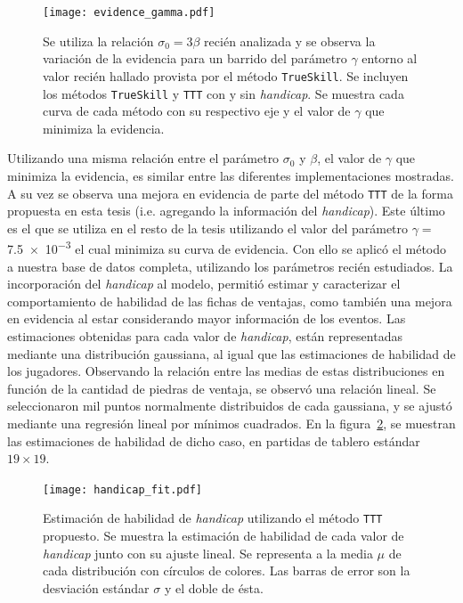 \documentclass[11pt,twoside,spanish]{report} %
\begin{document}
\begin{figure}[H]
	\centering
	\texttt{[image: evidence\_gamma.pdf]}
	\caption{Se utiliza la relaci\'on   $\sigma_0 = 3 \beta$ reci\'en analizada y se observa la variaci\'on de la evidencia para un barrido del par\'ametro $\gamma$ entorno al valor reci\'en hallado provista por el m\'etodo \texttt{TrueSkill}. Se incluyen los m\'etodos \texttt{TrueSkill} y \texttt{TTT} con y sin \textit{handicap}. Se muestra cada curva de cada m\'etodo con su respectivo eje y el valor de $\gamma$ que minimiza la evidencia.}
	\label{fig:tttBetaSigma}
\end{figure}



Utilizando una misma relaci\'on entre el par\'ametro $\sigma_0$ y $\beta$, el valor de $\gamma$ que minimiza la evidencia, es similar entre las diferentes implementaciones mostradas.
A su vez se observa una mejora en evidencia de parte del m\'etodo \texttt{TTT} de la forma propuesta en esta tesis (i.e. agregando la informaci\'on del \textit{handicap}).
Este \'ultimo es el que se utiliza en el resto de la tesis utilizando el valor del par\'ametro $\gamma= $\num{7.5e-3}  el cual minimiza su curva de evidencia.
Con ello se aplic\'o el m\'etodo a nuestra base de datos completa,  utilizando los par\'ametros reci\'en estudiados. 
La incorporaci\'on del \textit{handicap} al modelo, permiti\'o estimar y caracterizar el comportamiento de habilidad de las fichas de ventajas, como tambi\'en una mejora en evidencia al estar considerando mayor informaci\'on de los eventos.
Las estimaciones obtenidas para cada valor de \textit{handicap}, est\'an representadas mediante una distribuci\'on gaussiana, al igual que las estimaciones de habilidad de los jugadores.
Observando la relaci\'on entre las medias de estas distribuciones en funci\'on de la cantidad de piedras de ventaja, se observ\'o una relaci\'on lineal.
Se seleccionaron mil puntos normalmente distribuidos de cada gaussiana, y se ajust\'o mediante una regresi\'on lineal por m\'inimos cuadrados.
En la figura~\ref{fig:handicapFIT}, se muestran las estimaciones de habilidad de dicho caso, en partidas de tablero est\'andar $19\times 19$.


\begin{figure}[H]
	\centering
	\texttt{[image: handicap\_fit.pdf]}
	\caption{Estimaci\'on de habilidad de \textit{handicap} utilizando el m\'etodo \texttt{TTT} propuesto. Se muestra la estimaci\'on de habilidad de cada valor de \textit{handicap} junto con su ajuste lineal. Se representa a la media $\mu$ de cada distribuci\'on con c\'irculos de colores.  Las barras de error son la desviaci\'on est\'andar $\sigma$ y el doble de \'esta. }
	\label{fig:handicapFIT}
\end{figure}
\end{document}
